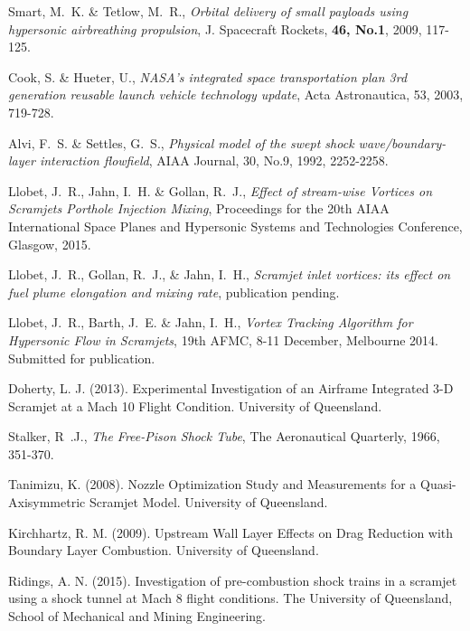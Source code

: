 \documentclass{AIAA}
\begin{document}
\begin{thebibliography}{}

Smart, M.~K. \& Tetlow, M.~R., {\it Orbital delivery of small payloads using hypersonic airbreathing propulsion}, J. Spacecraft Rockets, {\bf 46, No.1}, 2009, 117-125.

Cook, S. \& Hueter, U., {\it NASA's integrated space transportation plan 3rd generation reusable launch vehicle technology update}, Acta Astronautica, 53, 2003, 719-728.

Alvi, F.~S. \& Settles, G.~S., {\it Physical model of the swept shock wave/boundary-layer interaction flowfield}, AIAA Journal, 30, No.9, 1992, 2252-2258.

Llobet, J.~R., Jahn, I.~H. \& Gollan, R.~J., {\it Effect of stream-wise Vortices on Scramjets Porthole Injection Mixing}, Proceedings for the 20th AIAA International Space Planes and Hypersonic Systems and Technologies Conference, Glasgow, 2015. 

Llobet, J.~R., Gollan, R.~J., \& Jahn, I.~H., {\it Scramjet inlet vortices: its effect on fuel plume elongation and mixing rate}, publication pending.

Llobet, J.~R., Barth, J.~E. \& Jahn, I.~H., {\it Vortex Tracking Algorithm for Hypersonic Flow in Scramjets}, 19th AFMC, 8-11 December, Melbourne 2014. Submitted for publication.

Doherty, L. J. (2013). Experimental Investigation of an Airframe Integrated 3-D Scramjet at a Mach 10 Flight Condition. University of Queensland.

Stalker, R~.J., {\it The Free-Pison Shock Tube}, The Aeronautical Quarterly, 1966, 351-370.

Tanimizu, K. (2008). Nozzle Optimization Study and Measurements for a Quasi-Axisymmetric Scramjet Model. University of Queensland.

Kirchhartz, R. M. (2009). Upstream Wall Layer Effects on Drag Reduction with Boundary Layer Combustion. University of Queensland.

Ridings, A. N. (2015). Investigation of pre-combustion shock trains in a scramjet using a shock tunnel at Mach 8 flight conditions. The University of Queensland, School of Mechanical and Mining Engineering.


\end{thebibliography}
\end{document}
